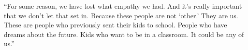 

``For some reason, we have lost what empathy we had. And it’s really
important that we don’t let that set in.  Because these people are not
`other.'  They are us.  These are people who previously sent their
kids to school.  People who have dreams about the future.  Kids who
want to be in a classroom.  It could be any of us.''

\bigskip


\smallskip


\bye
